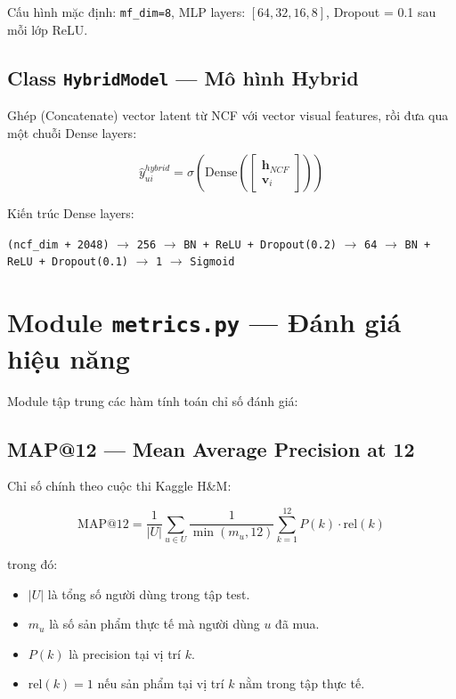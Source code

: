 \documentclass[12pt,a4paper]{article}
\begin{document}
Cấu hình mặc định: \texttt{mf\_dim=8}, MLP layers: $[64, 32, 16, 8]$,
Dropout = 0.1 sau mỗi lớp ReLU.

\subsection{Class \texttt{HybridModel} — Mô hình Hybrid}

Ghép (Concatenate) vector latent từ NCF với vector visual features,
rồi đưa qua một chuỗi Dense layers:

\begin{equation}
    \hat{y}_{ui}^{hybrid} = \sigma\!\left(
        \text{Dense}\!\left(
            \begin{bmatrix}
                \mathbf{h}_{NCF} \\ \mathbf{v}_i
            \end{bmatrix}
        \right)
    \right)
\end{equation}

Kiến trúc Dense layers:
\begin{center}
\texttt{(ncf\_dim + 2048)} $\to$ \texttt{256} $\to$ \texttt{BN + ReLU + Dropout(0.2)}
$\to$ \texttt{64} $\to$ \texttt{BN + ReLU + Dropout(0.1)}
$\to$ \texttt{1} $\to$ \texttt{Sigmoid}
\end{center}

\section{Module \texttt{metrics.py} — Đánh giá hiệu năng}

Module tập trung các hàm tính toán chỉ số đánh giá:

\subsection{MAP@12 — Mean Average Precision at 12}

Chỉ số chính theo cuộc thi Kaggle H\&M:

\begin{equation}
    \text{MAP@12} = \frac{1}{|U|} \sum_{u \in U}
    \frac{1}{\min(m_u, 12)}
    \sum_{k=1}^{12} P(k) \cdot \text{rel}(k)
\end{equation}

trong đó:
\begin{itemize}[leftmargin=2em]
    \item $|U|$ là tổng số người dùng trong tập test.
    \item $m_u$ là số sản phẩm thực tế mà người dùng $u$ đã mua.
    \item $P(k)$ là precision tại vị trí $k$.
    \item $\text{rel}(k) = 1$ nếu sản phẩm tại vị trí $k$ nằm trong tập thực tế.
\end{itemize}
\end{document}
